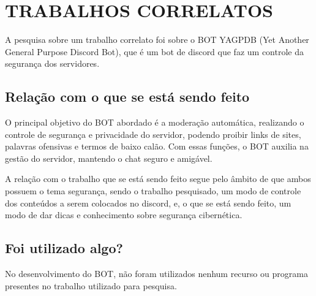 \chapter{\uppercase{Trabalhos Correlatos}}
\label{referencial}

A pesquisa sobre um trabalho correlato foi sobre o BOT YAGPDB (Yet Another General Purpose Discord Bot), que é um bot de discord que faz um controle da segurança dos servidores.\cite{yagpdb}

\section{Relação com o que se está sendo feito}

O principal objetivo do BOT abordado é a moderação automática, realizando o controle de segurança e privacidade do servidor, podendo proibir links de sites, palavras ofensivas e termos de baixo calão. Com essas funções, o BOT auxilia na gestão do servidor, mantendo o chat seguro e amigável.

A relação com o trabalho que se está sendo feito segue pelo âmbito de que ambos possuem o tema segurança, sendo o trabalho pesquisado, um modo de controle dos conteúdos a serem colocados no discord, e, o que se está sendo feito, um modo de dar dicas e conhecimento sobre segurança cibernética.

\section{Foi utilizado algo?}
 
No desenvolvimento do BOT, não foram utilizados nenhum recurso ou programa presentes no trabalho utilizado para pesquisa.

